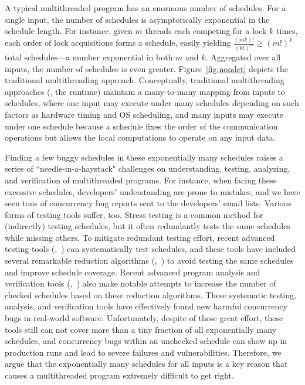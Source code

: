 A typical multithreaded program has an enormous number of schedules.  For
a single input, the number of schedules is asymptotically exponential in
the schedule length.  For instance, given $m$ threads each competing for a
lock $k$ times, each order of lock acquisitions forms a schedule, easily
yielding $\frac{(mk)!}{(k!)^m} \ge (m!)^k$ total schedules---a number
exponential in both $m$ and $k$. Aggregated over all inputs, the number of
schedules is even greater. Figure~\ref{fig:nondet} depicts the traditional
multithreading approach. Conceptually, traditional multithreading approaches
(\eg, the \pthread runtime) maintain a many-to-many mapping from inputs to 
schedules, where one input may execute under many schedules depending on such 
factors as hardware timing and OS scheduling, and many inputs may execute 
under one schedule because a schedule fixes the order of the communication 
operations but allows the local computations to operate on any input data.

Finding a few buggy schedules in these exponentially many schedules raises
a series of ``needle-in-a-haystack" challenges on understanding, testing,
analyzing, and verification of multithreaded programs. For
instance, when facing these excessive schedules, developers' understanding are 
prone to mistakes, and we have seen tons of concurrency bug reports sent to the 
developers' email lists. Various forms of testing tools suffer, too.  Stress 
testing is a common method for (indirectly) testing schedules, but it often 
redundantly tests the same schedules while missing others. To mitigate 
redundant testing effort, recent advanced testing tools 
(\eg,~\cite{musuvathi:chess:osdi08, modist:nsdi09, dbug:ssv10, demeter:sosp11}) 
can systematically test schedules, and these tools have included several 
remarkable reduction algorithms (\eg,~\cite{flanagan:dynamicpo, 
demeter:sosp11}) to avoid testing the same schedules and improve schedule 
coverage. Recent advanced program analysis and verification tools 
(\eg,~\cite{demeter:sosp11}) also make notable attempts to increase the number 
of checked schedules based on these reduction algorithms. These systematic 
testing, analysis, and verification tools have effectively found new harmful 
concurrency bugs in real-world software. Unfortunately, despite of these great
effort, these tools still can not cover more than a tiny fraction of all
exponentially many schedules, and concurrency bugs within an unchecked schedule
can show up in production runs and lead to severe failures and vulnerabilities. 
Therefore, we argue that the exponentially many schedules for all inputs is a 
key reason that causes a multithreaded program extremely difficult to get right.


